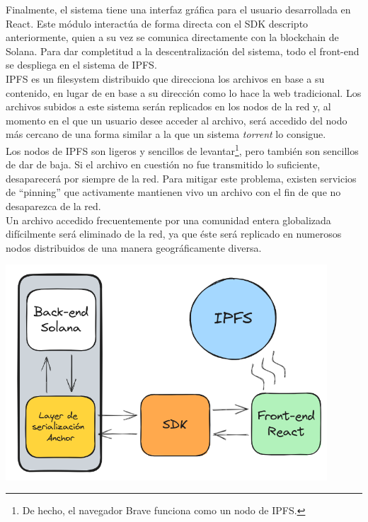 \begin{multicols}{2}
Finalmente, el sistema tiene una interfaz gráfica para el usuario desarrollada en React\cite{react}. Este módulo interactúa de forma directa con el SDK descripto anteriormente, quien a su vez se comunica directamente con la blockchain de Solana. Para dar completitud a la descentralización del sistema, todo el front-end se despliega en el sistema de IPFS\cite{ipfs}.\\

IPFS es un filesystem distribuido que direcciona los archivos en base a su contenido, en lugar de en base a su dirección como lo hace la web tradicional. Los archivos subidos a este sistema serán replicados en los nodos de la red y, al momento en el que un usuario desee acceder al archivo, será accedido del nodo más cercano de una forma similar a la que un sistema \textit{torrent} lo consigue.\\

Los nodos de IPFS son ligeros y sencillos de levantar\footnote{De hecho, el navegador Brave funciona como un nodo de IPFS\cite{brave-ipfs}.}, pero también son sencillos de dar de baja. Si el archivo en cuestión no fue transmitido lo suficiente, desaparecerá por siempre de la red. Para mitigar este problema, existen servicios de ``pinning'' que activamente mantienen vivo un archivo con el fin de que no desaparezca de la red.\\

Un archivo accedido frecuentemente por una comunidad entera globalizada difícilmente será eliminado de la red, ya que éste será replicado en numerosos nodos distribuidos de una manera geográficamente diversa.\\

\begin{Figure}
\centering
    \includegraphics[width=0.90\textwidth]{img/cubitorium_arch.png}
 \label{fig:arquitectura}
\end{Figure}


\end{multicols}
